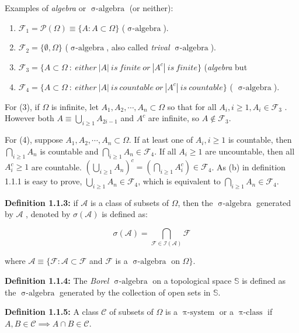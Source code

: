 \documentclass{article}
\newcommand{\mc}{\mathcal}
\newcommand{\mb}{\mathbb}
\DeclareMathOperator{\sialge}{\sigma-algebra}
\DeclareMathOperator{\pisys}{\pi-system}
\DeclareMathOperator{\picls}{\pi-class}
\begin{document}
\vspace{2mm}
Examples of \textit{algebra} or \(\sialge\) (or neither):

\begin{enumerate}
\item \(\mc{F}_1=\mc{P}(\Omega)\equiv\{A: A \subset \Omega\}\) (\(\sialge\)).
\item \(\mc{F}_2= \{\emptyset, \Omega \} \) (\(\sialge\), also called \textit{trival \(\sialge\)}).
\item \(\mc{F}_3= \{A \subset \Omega\: :\: either\: |A|\: is\: finite\: or\: |A^c|\: is\: finite \} \) (\textit{algebra} but 
\item \(\mc{F}_4= \{A \subset \Omega\: :\: either\: |A|\: is\: countable\: or\: |A^c|\: is\: countable \} \) ( 
\(\sialge\)).
\end{enumerate}

For (3), if \(\Omega\) is infinite, let \({A_1, A_2, \cdots, A_n} \subset \Omega\) so that for all \(A_i, i\geq 1, A_i \in \mc{F}_3\)
. However both \(A\equiv \bigcup_{i\geq 1} A_{2i-1}\) and \(A^c\) are infinite, so \(A \not\in \mc{F}_3\).

\vspace{2mm}
For (4), suppose \(A_1, A_2, \cdots, A_n \subset \Omega\). If at least one of \(A_i, i\geq 1\) is countable, then \(\bigcap_{i\geq 1}A_n\)
is countable and \(\bigcap_{i\geq 1}A_n \in \mc{F}_4\). If all \(A_i \geq 1\) are uncountable, then all \(A_i^c \geq 1\) are
countable. \((\bigcup_{i\geq 1}A_n)^c=(\bigcap_{i\geq 1}A_i^c) \in \mc{F}_4\). As (b) in definition 1.1.1 is easy to prove, \(\bigcup_{i\geq 1}A_n \in \mc{F}_4\),
which is equivalent to \(\bigcap_{i\geq 1}A_n\in \mc{F}_4\). 

\vspace{2mm}
\textbf{Definition 1.1.3: } if \(\mc{A}\) is a class of subsets of \(\Omega\), then the \(\sialge\) generated by \(\mc{A}\)
, denoted by \(\sigma(\mc{A})\) is defined as:

\[
\sigma(\mc{A}) = \bigcap_{\mc{F}\in \mc{I}(\mc{A})}\mc{F}   
\]

where \(\mc{A}\equiv \{\mc{F}: \mc{A} \subset \mc{F}\) and \(\mc{F}\) is a \(\sialge\) on  \(\Omega\}\).

\vspace{2mm}
\textbf{Definition 1.1.4: } The \textit{Borel \(\sialge\)} on a topological space \(\mb{S}\) is defined as the \(\sialge\) generated
by the collection of open sets in \(\mb{S}\).

\vspace{2mm}
\textbf{Definition 1.1.5: } A class \(\mc{C}\) of subsets of \(\Omega\) is a \(\pisys\) or a \(\picls\) if
\(A, B \in \mc{C} \implies A \cap B \in \mc{C}\).
\end{document}
